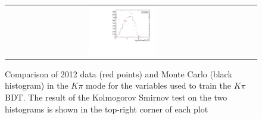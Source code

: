 \begin{figure}
\begin{tabular}{ccc}
\includegraphics[width=0.3\textwidth]{ANA_resources/Plots/Monte_carlo/data_vs_MC/Kpi/log10(KstarPi_PT)_2012.pdf} & & \\
\end{tabular}
\caption{Comparison of 2012 data (red points) and Monte Carlo (black histogram) in the $K\pi$ mode for the variables used to train the $K\pi$ BDT. The result of the Kolmogorov Smirnov test on the two histograms is shown in the top-right corner of each plot}
\label{fig:data_vs_MC_Kpi_2012}
\end{figure}
